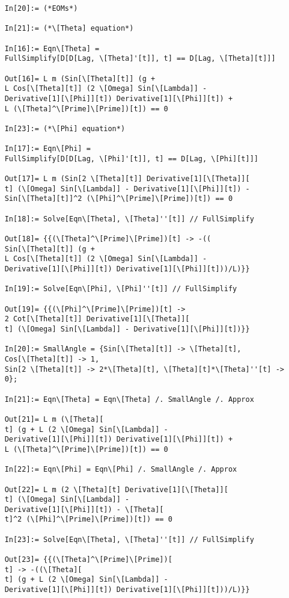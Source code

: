 \documentclass{article}
\theoremstyle{definition}
\begin{document}
\begin{enumerate}[label=(\alph*)]
\begin{lstlisting}
	In[20]:= (*EOMs*)
	
	In[21]:= (*\[Theta] equation*)
	
	In[16]:= Eqn\[Theta] = 
	FullSimplify[D[D[Lag, \[Theta]'[t]], t] == D[Lag, \[Theta][t]]]
	
	Out[16]= L m (Sin[\[Theta][t]] (g + 
	L Cos[\[Theta][t]] (2 \[Omega] Sin[\[Lambda]] - 
	Derivative[1][\[Phi]][t]) Derivative[1][\[Phi]][t]) + 
	L (\[Theta]^\[Prime]\[Prime])[t]) == 0
	
	In[23]:= (*\[Phi] equation*)
	
	In[17]:= Eqn\[Phi] = 
	FullSimplify[D[D[Lag, \[Phi]'[t]], t] == D[Lag, \[Phi][t]]]
	
	Out[17]= L m (Sin[2 \[Theta][t]] Derivative[1][\[Theta]][
	t] (\[Omega] Sin[\[Lambda]] - Derivative[1][\[Phi]][t]) - 
	Sin[\[Theta][t]]^2 (\[Phi]^\[Prime]\[Prime])[t]) == 0
	
	In[18]:= Solve[Eqn\[Theta], \[Theta]''[t]] // FullSimplify
	
	Out[18]= {{(\[Theta]^\[Prime]\[Prime])[t] -> -((
	Sin[\[Theta][t]] (g + 
	L Cos[\[Theta][t]] (2 \[Omega] Sin[\[Lambda]] - 
	Derivative[1][\[Phi]][t]) Derivative[1][\[Phi]][t]))/L)}}
	
	In[19]:= Solve[Eqn\[Phi], \[Phi]''[t]] // FullSimplify
	
	Out[19]= {{(\[Phi]^\[Prime]\[Prime])[t] -> 
	2 Cot[\[Theta][t]] Derivative[1][\[Theta]][
	t] (\[Omega] Sin[\[Lambda]] - Derivative[1][\[Phi]][t])}}
	
	In[20]:= SmallAngle = {Sin[\[Theta][t]] -> \[Theta][t], 
	Cos[\[Theta][t]] -> 1, 
	Sin[2 \[Theta][t]] -> 2*\[Theta][t], \[Theta][t]*\[Theta]''[t] -> 
	0};
	
	In[21]:= Eqn\[Theta] = Eqn\[Theta] /. SmallAngle /. Approx
	
	Out[21]= L m (\[Theta][
	t] (g + L (2 \[Omega] Sin[\[Lambda]] - 
	Derivative[1][\[Phi]][t]) Derivative[1][\[Phi]][t]) + 
	L (\[Theta]^\[Prime]\[Prime])[t]) == 0
	
	In[22]:= Eqn\[Phi] = Eqn\[Phi] /. SmallAngle /. Approx
	
	Out[22]= L m (2 \[Theta][t] Derivative[1][\[Theta]][
	t] (\[Omega] Sin[\[Lambda]] - 
	Derivative[1][\[Phi]][t]) - \[Theta][
	t]^2 (\[Phi]^\[Prime]\[Prime])[t]) == 0
	
	In[23]:= Solve[Eqn\[Theta], \[Theta]''[t]] // FullSimplify
	
	Out[23]= {{(\[Theta]^\[Prime]\[Prime])[
	t] -> -((\[Theta][
	t] (g + L (2 \[Omega] Sin[\[Lambda]] - 
	Derivative[1][\[Phi]][t]) Derivative[1][\[Phi]][t]))/L)}}
	

\end{lstlisting}
\end{enumerate}
\end{document}
